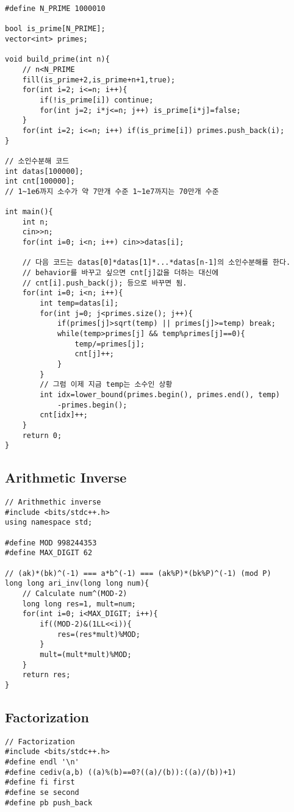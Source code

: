 \documentclass[10pt, landscape]{article}
\begin{document}
\begin{multicols}{2}
\begin{verbatim}
#define N_PRIME 1000010

bool is_prime[N_PRIME];
vector<int> primes;

void build_prime(int n){
    // n<N_PRIME
    fill(is_prime+2,is_prime+n+1,true);
    for(int i=2; i<=n; i++){
        if(!is_prime[i]) continue;
        for(int j=2; i*j<=n; j++) is_prime[i*j]=false;
    }
    for(int i=2; i<=n; i++) if(is_prime[i]) primes.push_back(i);
}

// 소인수분해 코드
int datas[100000];
int cnt[100000]; 
// 1~1e6까지 소수가 약 7만개 수준 1~1e7까지는 70만개 수준

int main(){
    int n;
    cin>>n;
    for(int i=0; i<n; i++) cin>>datas[i];

    // 다음 코드는 datas[0]*datas[1]*...*datas[n-1]의 소인수분해를 한다.
    // behavior를 바꾸고 싶으면 cnt[j]값을 더하는 대신에 
    // cnt[i].push_back(j); 등으로 바꾸면 됨.
    for(int i=0; i<n; i++){
        int temp=datas[i];
        for(int j=0; j<primes.size(); j++){
            if(primes[j]>sqrt(temp) || primes[j]>=temp) break;
            while(temp>primes[j] && temp%primes[j]==0){
                temp/=primes[j];
                cnt[j]++;
            }
        }
        // 그럼 이제 지금 temp는 소수인 상황
        int idx=lower_bound(primes.begin(), primes.end(), temp)
            -primes.begin();
        cnt[idx]++;
    }
    return 0;
}
\end{verbatim}

\subsection{Arithmetic Inverse}
\begin{verbatim}
// Arithmethic inverse
#include <bits/stdc++.h>
using namespace std;

#define MOD 998244353
#define MAX_DIGIT 62

// (ak)*(bk)^(-1) === a*b^(-1) === (ak%P)*(bk%P)^(-1) (mod P)
long long ari_inv(long long num){
    // Calculate num^(MOD-2)
    long long res=1, mult=num;
    for(int i=0; i<MAX_DIGIT; i++){
        if((MOD-2)&(1LL<<i)){
            res=(res*mult)%MOD;
        }
        mult=(mult*mult)%MOD;
    }
    return res;
}
\end{verbatim}

\subsection{Factorization}
\begin{verbatim}
// Factorization
#include <bits/stdc++.h>
#define endl '\n'
#define cediv(a,b) ((a)%(b)==0?((a)/(b)):((a)/(b))+1)
#define fi first
#define se second
#define pb push_back


\end{verbatim}
\end{multicols}
\end{document}
